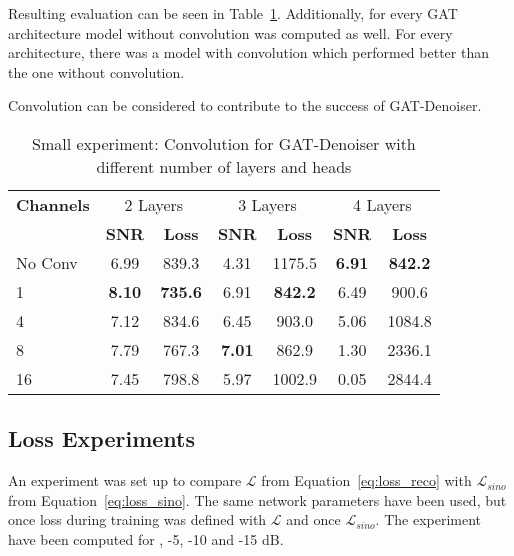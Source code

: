 Resulting evaluation can be seen in Table~\ref{tab:small_convolution_2}.
Additionally, for every GAT architecture model without convolution was computed as well.
For every architecture, there was a model with convolution which performed better than the one without convolution.


\begin{tcolorbox}[colback=red!5!white,colframe=red!75!black]
  Convolution can be considered to contribute to the success of GAT-Denoiser.
\end{tcolorbox}



\begin{table}[H]
  \centering
  \begin{tabular}{l|cc|cc|cc}
    \toprule
    \textbf{Channels } & \multicolumn{2}{c|}{2 Layers} & \multicolumn{2}{c|}{3 Layers} & \multicolumn{2}{c}{4 Layers}  \\
                       & \textbf{SNR} & \textbf{Loss} & \textbf{SNR} & \textbf{Loss} & \textbf{SNR} & \textbf{Loss} \\ 
    \midrule
		No Conv & 6.99  & 839.3 & 4.31   & 1175.5 & \textbf{6.91} & \textbf{842.2}     \\ \hline
		1       & \textbf{8.10}  & \textbf{735.6} & 6.91   & \textbf{842.2} & 6.49 & 900.6     \\ \hline
		4       & 7.12  & 834.6 & 6.45   & 903.0 & 5.06 & 1084.8   \\ \hline
		8       & 7.79  & 767.3 & \textbf{7.01}   & 862.9 & 1.30 & 2336.1    \\ \hline
		16      & 7.45  & 798.8 & 5.97   & 1002.9 & 0.05  & 2844.4   \\
    \midrule
  \end{tabular}

  \caption{Small experiment: Convolution for GAT-Denoiser with different number of layers and heads}
  \label{tab:small_convolution_2}
\end{table}


\subsection{Loss Experiments}
An experiment was set up to compare $\mathcal{L}$ from Equation~\ref{eq:loss_reco} 
with $\mathcal{L}_{sino}$ from Equation~\ref{eq:loss_sino}.
The same network parameters have been used, but once loss during training was defined 
with $\mathcal{L}$ and once $\mathcal{L}_{sino}$. The experiment
have been computed for , -5, -10 and -15 dB.

